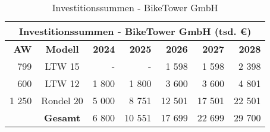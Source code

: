 \begin{table}[H]
  \centering
  \begin{tabular}{rcrrrrr}
    \multicolumn{7}{c}{\textbf{Investitionssummen - BikeTower GmbH} (tsd. \euro)}                                 \\
    \toprule
    \textbf{AW} & \textbf{Modell} & \textbf{2024} & \textbf{2025} & \textbf{2026} & \textbf{2027} & \textbf{2028} \\
    \midrule
    799         & LTW 15          & -             & -             & 1 598         & 1 598         & 2 398         \\
    600         & LTW 12          & 1 800         & 1 800         & 3 600         & 3 600         & 4 801         \\
    1 250       & Rondel 20       & 5 000         & 8 751         & 12 501        & 17 501        & 22 501        \\
    \midrule
                & \textbf{Gesamt} & 6 800         & 10 551        & 17 699        & 22 699        & 29 700        \\
    \bottomrule
  \end{tabular}
  \caption{Investitionssummen - BikeTower GmbH}
  \label{tab:investitionssummen_biketower}
\end{table}